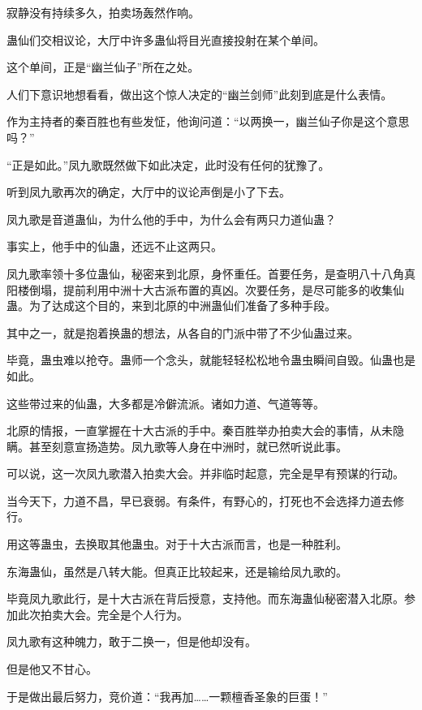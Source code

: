 
\begin{this_body}

寂静没有持续多久，拍卖场轰然作响。

蛊仙们交相议论，大厅中许多蛊仙将目光直接投射在某个单间。

这个单间，正是“幽兰仙子”所在之处。

人们下意识地想看看，做出这个惊人决定的“幽兰剑师”此刻到底是什么表情。

作为主持者的秦百胜也有些发怔，他询问道：“以两换一，幽兰仙子你是这个意思吗？”

“正是如此。”凤九歌既然做下如此决定，此时没有任何的犹豫了。

听到凤九歌再次的确定，大厅中的议论声倒是小了下去。

凤九歌是音道蛊仙，为什么他的手中，为什么会有两只力道仙蛊？

事实上，他手中的仙蛊，还远不止这两只。

凤九歌率领十多位蛊仙，秘密来到北原，身怀重任。首要任务，是查明八十八角真阳楼倒塌，提前利用中洲十大古派布置的真凶。次要任务，是尽可能多的收集仙蛊。为了达成这个目的，来到北原的中洲蛊仙们准备了多种手段。

其中之一，就是抱着换蛊的想法，从各自的门派中带了不少仙蛊过来。

毕竟，蛊虫难以抢夺。蛊师一个念头，就能轻轻松松地令蛊虫瞬间自毁。仙蛊也是如此。

这些带过来的仙蛊，大多都是冷僻流派。诸如力道、气道等等。

北原的情报，一直掌握在十大古派的手中。秦百胜举办拍卖大会的事情，从未隐瞒。甚至刻意宣扬造势。凤九歌等人身在中洲时，就已然听说此事。

可以说，这一次凤九歌潜入拍卖大会。并非临时起意，完全是早有预谋的行动。

当今天下，力道不昌，早已衰弱。有条件，有野心的，打死也不会选择力道去修行。

用这等蛊虫，去换取其他蛊虫。对于十大古派而言，也是一种胜利。

东海蛊仙，虽然是八转大能。但真正比较起来，还是输给凤九歌的。

毕竟凤九歌此行，是十大古派在背后授意，支持他。而东海蛊仙秘密潜入北原。参加此次拍卖大会。完全是个人行为。

凤九歌有这种魄力，敢于二换一，但是他却没有。

但是他又不甘心。

于是做出最后努力，竞价道：“我再加……一颗檀香圣象的巨蛋！”


\end{this_body}

